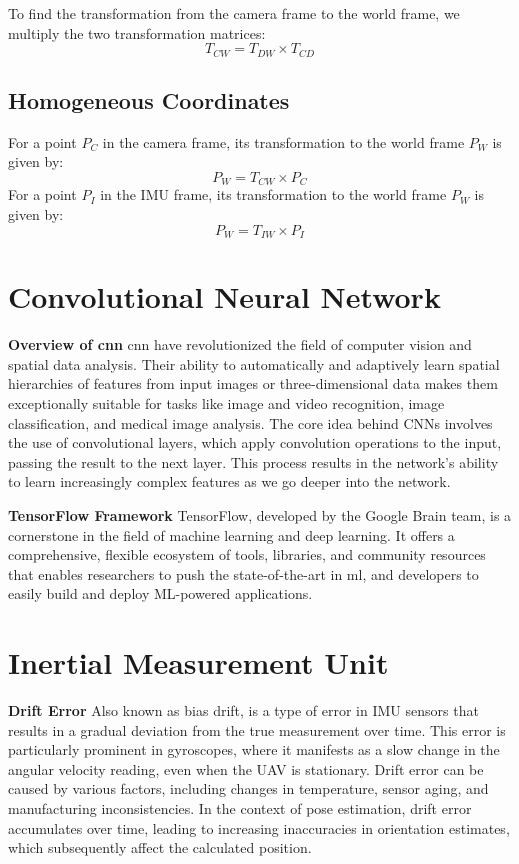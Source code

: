 To find the transformation from the camera frame to the world frame, we multiply the two transformation matrices:
\[ T_{CW} = T_{DW} \times T_{CD} \]

\subsection{Homogeneous Coordinates}

For a point \( P_C \) in the camera frame, its transformation to the world frame \( P_W \) is given by:
\[ P_W = T_{CW} \times P_C \]
For a point \( P_I \) in the IMU frame, its transformation to the world frame \( P_W \) is given by:
\[ P_W = T_{IW} \times P_I \]

\section{Convolutional Neural Network}
\textbf{Overview of \acrshort{cnn}} \acrshort{cnn} have revolutionized the field of computer vision and spatial data analysis. Their ability to automatically and adaptively learn spatial hierarchies of features from input images or three-dimensional data makes them exceptionally suitable for tasks like image and video recognition, image classification, and medical image analysis. The core idea behind CNNs involves the use of convolutional layers, which apply convolution operations to the input, passing the result to the next layer. This process results in the network's ability to learn increasingly complex features as we go deeper into the network.

\textbf{TensorFlow Framework}
TensorFlow, developed by the Google Brain team, is a cornerstone in the field of machine learning and deep learning. It offers a comprehensive, flexible ecosystem of tools, libraries, and community resources that enables researchers to push the state-of-the-art in \acrfull{ml}, and developers to easily build and deploy ML-powered applications. 

\section{Inertial Measurement Unit}

\textbf{Drift Error} Also known as bias drift, is a type of error in IMU sensors that results in a gradual deviation from the true measurement over time. This error is particularly prominent in gyroscopes, where it manifests as a slow change in the angular velocity reading, even when the UAV is stationary. Drift error can be caused by various factors, including changes in temperature, sensor aging, and manufacturing inconsistencies. In the context of pose estimation, drift error accumulates over time, leading to increasing inaccuracies in orientation estimates, which subsequently affect the calculated position.


